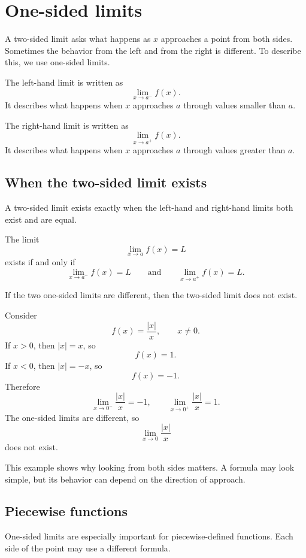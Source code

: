\section{One-sided limits}

A two-sided limit asks what happens as \(x\) approaches a point from both sides. Sometimes the behavior from the left and from the right is different. To describe this, we use one-sided limits.

The left-hand limit is written as
\[
\lim_{x\to a^-} f(x).
\]
It describes what happens when \(x\) approaches \(a\) through values smaller than \(a\).

The right-hand limit is written as
\[
\lim_{x\to a^+} f(x).
\]
It describes what happens when \(x\) approaches \(a\) through values greater than \(a\).

\subsection*{When the two-sided limit exists}

A two-sided limit exists exactly when the left-hand and right-hand limits both exist and are equal.

\begin{theorembox}
The limit
\[
\lim_{x\to a}f(x)=L
\]
exists if and only if
\[
\lim_{x\to a^-}f(x)=L
\qquad\text{and}\qquad
\lim_{x\to a^+}f(x)=L.
\]
\end{theorembox}

If the two one-sided limits are different, then the two-sided limit does not exist.

\begin{examplebox}
Consider
\[
f(x)=\frac{|x|}{x},
\qquad x\ne0.
\]
If \(x>0\), then \(|x|=x\), so
\[
f(x)=1.
\]
If \(x<0\), then \(|x|=-x\), so
\[
f(x)=-1.
\]
Therefore
\[
\lim_{x\to0^-}\frac{|x|}{x}=-1,
\qquad
\lim_{x\to0^+}\frac{|x|}{x}=1.
\]
The one-sided limits are different, so
\[
\lim_{x\to0}\frac{|x|}{x}
\]
does not exist.
\end{examplebox}

This example shows why looking from both sides matters. A formula may look simple, but its behavior can depend on the direction of approach.

\subsection*{Piecewise functions}

One-sided limits are especially important for piecewise-defined functions. Each side of the point may use a different formula.

